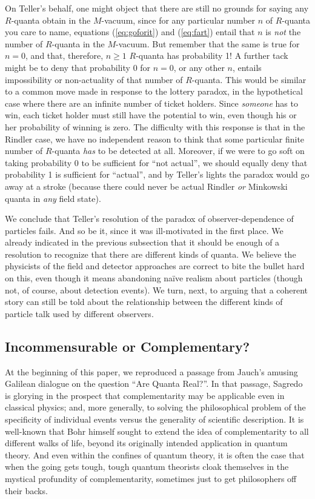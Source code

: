 \documentclass[12pt]{article}
\theoremstyle{remark}
\theoremstyle{definition}
\begin{document}
On Teller's behalf, one might object that there are still no grounds 
for saying any $R$-quanta obtain in the $M$-vacuum, since for any 
particular number $n$ of $R$-quanta you care to name, 
equations (\ref{eq:goforit}) and (\ref{eq:fart}) entail that $n$
is \emph{not} the number of $R$-quanta in the $M$-vacuum.  But 
remember that the same is true for $n=0$, and that, therefore, $n\geq 
1$ $R$-quanta has probability 1!  A further tack might be to deny that 
probability $0$ for $n=0$, or any other $n$, entails 
impossibility or non-actuality of that number of $R$-quanta.  
This would be similar to a common move made in 
response to the lottery paradox, in the hypothetical case 
where there are an infinite number of 
ticket holders.  Since \emph{someone} has to win, each ticket holder must 
still have the potential to win, even though his or her probability of 
winning is zero.  The difficulty with this response is that in the 
Rindler case, we have no independent reason to think that some 
particular finite number of $R$-quanta \emph{has} to be detected at 
all.  
Moreover, if we were to go soft on taking probability $0$ to be 
sufficient for ``not actual'', we should equally deny that probability 1 
is sufficient for ``actual'', and by Teller's lights the paradox would go away at a 
stroke (because there could never be actual Rindler \emph{or} Minkowski quanta
 in \emph{any} field state).

We conclude that Teller's resolution of the paradox of 
observer-dependence of particles fails.  And so be it, since it was 
ill-motivated in the first place. 
We already indicated in the previous subsection that
it should be enough of a resolution to recognize that there are
different kinds of quanta.  We believe the physicists of the field and
detector approaches are correct to bite the bullet hard on this, even
though it means abandoning na\"{i}ve realism about particles
(though not, of course, about detection events).  We turn, next, to
arguing that a coherent story can still be told about
the relationship between the different kinds of particle talk used by
different observers.

\subsection{Incommensurable or Complementary?}

At the beginning of this paper, we reproduced a passage from Jauch's 
amusing Galilean dialogue on the question ``Are Quanta Real?''.  
In that passage, Sagredo is glorying in the prospect that 
complementarity may be applicable even in classical physics; and, more 
generally, to 
solving 
the philosophical problem of the specificity of individual 
events versus the generality of scientific description.  
It is well-known that Bohr himself sought to extend the idea of complementarity 
to all different walks of life, beyond its originally intended 
application in quantum theory.  And even within the confines of quantum theory, it is 
often the case 
that 
when the going gets tough, tough quantum theorists cloak themselves in 
the mystical profundity of complementarity, sometimes just 
to get philosophers off their backs.
  
\end{document}

